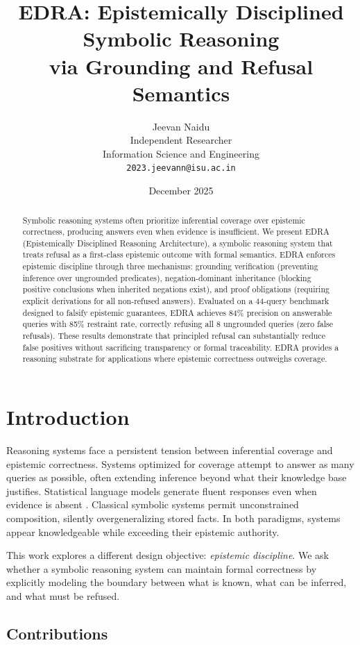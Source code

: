 \documentclass[11pt]{article}
\title{\textbf{EDRA: Epistemically Disciplined Symbolic Reasoning\\via Grounding and Refusal Semantics}}
\author{
Jeevan Naidu \\
Independent Researcher \\
Information Science and Engineering \\
\texttt{2023.jeevann@isu.ac.in}
}
\date{December 2025}
\begin{document}
\maketitle

\begin{abstract}
Symbolic reasoning systems often prioritize inferential coverage over epistemic correctness, producing answers even when evidence is insufficient. We present EDRA (Epistemically Disciplined Reasoning Architecture), a symbolic reasoning system that treats refusal as a first-class epistemic outcome with formal semantics. EDRA enforces epistemic discipline through three mechanisms: grounding verification (preventing inference over ungrounded predicates), negation-dominant inheritance (blocking positive conclusions when inherited negations exist), and proof obligations (requiring explicit derivations for all non-refused answers). Evaluated on a 44-query benchmark designed to falsify epistemic guarantees, EDRA achieves 84\% precision on answerable queries with 85\% restraint rate, correctly refusing all 8 ungrounded queries (zero false refusals). These results demonstrate that principled refusal can substantially reduce false positives without sacrificing transparency or formal traceability. EDRA provides a reasoning substrate for applications where epistemic correctness outweighs coverage.
\end{abstract}

\section{Introduction}

Reasoning systems face a persistent tension between inferential coverage and epistemic correctness. Systems optimized for coverage attempt to answer as many queries as possible, often extending inference beyond what their knowledge base justifies. Statistical language models generate fluent responses even when evidence is absent \cite{bender2021dangers}. Classical symbolic systems permit unconstrained composition, silently overgeneralizing stored facts. In both paradigms, systems appear knowledgeable while exceeding their epistemic authority.

This work explores a different design objective: \emph{epistemic discipline}. We ask whether a symbolic reasoning system can maintain formal correctness by explicitly modeling the boundary between what is known, what can be inferred, and what must be refused.

\subsection{Contributions}
\end{document}
